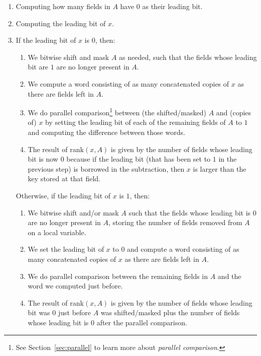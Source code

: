 \begin{enumerate}
    \item
    Computing how many fields in $A$ have $0$ as their leading bit.
    
    \item
    Computing the leading bit of $x$.
    
    \item
    If the leading bit of $x$ is $0$, then:
    \begin{enumerate}
        \item
        We bitwise shift and mask $A$ as needed, such that the fields whose leading bit are $1$ are no longer present in $A$.
        
        \item
        We compute a word consisting of as many concatenated copies of $x$ as there are fields left in $A$.
        
        \item
        We do parallel comparison\footnote{See Section~\ref{sec:parallel} to learn more about \textit{parallel comparison}.} between (the shifted/masked) $A$ and (copies of) $x$ by setting the leading bit of each of the remaining fields of $A$ to $1$ and computing the difference between those words.
        
        \item
        The result of rank$(x,A)$ is given by the number of fields whose leading bit is now $0$ because if the leading bit (that has been set to $1$ in the previous step) is borrowed in the subtraction, then $x$ is larger than the key stored at that field.
    \end{enumerate}
    
    Otherwise, if the leading bit of $x$ is $1$, then:
    \begin{enumerate}
        \item
        We bitwise shift and/or mask $A$ such that the fields whose leading bit is $0$ are no longer present in $A$, storing the number of fields removed from $A$ on a local variable.
        
        \item
		We set the leading bit of $x$ to $0$ and compute a word consisting of as many concatenated copies of $x$ as there are fields left in $A$.
		
		\item
        We do parallel comparison between the remaining fields in $A$ and the word we computed just before.
        
        \item
        The result of rank$(x,A)$ is given by the number of fields whose leading bit was $0$ just before $A$ was shifted/masked plus the number of fields whose leading bit is $0$ after the parallel comparison.
    \end{enumerate}
    
\end{enumerate}

